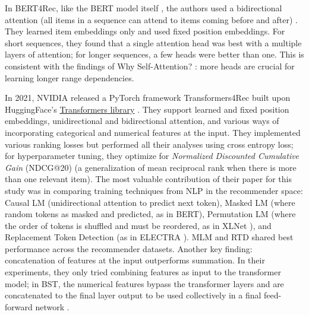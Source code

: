 \documentclass[10pt]{article}
\begin{document}
In BERT4Rec, like the BERT model itself \cite{Devlin2019}, the authors used a bidirectional attention (all items in a sequence can attend to items coming before and after) \cite{Bert4Rec}. They learned item embeddings only and used fixed position embeddings. For short sequences, they found that a single attention head was best with a multiple layers of attention; for longer sequences, a few heads were better than one. This is consistent with the findings of Why Self-Attention? \cite{whySA}: more heads are crucial for learning longer range dependencies.

In 2021, NVIDIA released a PyTorch framework Transformers4Rec built upon HuggingFace’s \href{Hugging Face Transformers}{Transformers library} \cite{Transformers4Rec}. They support learned and fixed position embeddings, unidirectional and bidirectional attention, and various ways of incorporating categorical and numerical features at the input. They implemented various ranking losses but performed all their analyses using cross entropy loss; for hyperparameter tuning, they optimize for \emph{Normalized Discounted Cumulative Gain} (NDCG@20) (a generalization of mean reciprocal rank when there is more than one relevant item). The most valuable contribution of their paper for this study was in comparing training techniques from NLP in the recommender space: Causal LM (unidirectional attention to predict next token), Masked LM (where random tokens as masked and predicted, as in BERT), Permutation LM (where the order of tokens is shuffled and must be reordered, as in XLNet \cite{XLNet}), and Replacement Token Detection (as in ELECTRA \cite{ELECTRA}). MLM and RTD shared best performance across the recommender datasets. Another key finding: concatenation of features at the input outperforms summation. In their experiments, they only tried combining features as input to the transformer model; in BST, the numerical features bypass the transformer layers and are concatenated to the final layer output to be used collectively in a final feed-forward network  \cite{BST}. 
\end{document}
